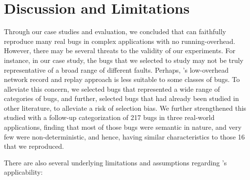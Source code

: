 
\section{Discussion and Limitations}
\label{sec:threats}

Through our case studies and evaluation, we concluded that \parikshan can faithfully reproduce many real bugs in complex applications with no running-overhead.
However, there may be several threats to the validity of our experiments.
For instance, in our case study, the bugs that we selected to study may not be truly representative of a broad range of different faults.
Perhaps, \parikshan's low-overhead network record and replay approach is less suitable to some classes of bugs.
To alleviate this concern, we selected bugs that represented a wide range of categories of bugs, and further, selected bugs that had already been studied in other literature, to alleviate a risk of selection bias.
We further strengthened this studied with a follow-up categorization of 217 bugs in three real-world applications, finding that most of those bugs were semantic in nature, and very few were non-deterministic, and hence, having similar characteristics to those 16 that we reproduced. 

There are also several underlying limitations and assumptions regarding \parikshan's applicability:



